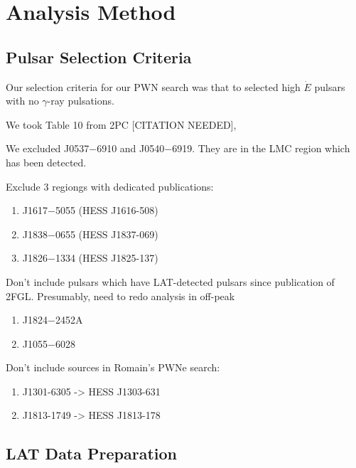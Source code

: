 \section{Analysis Method}

\subsection{Pulsar Selection Criteria}

Our selection criteria for our PWN search was that to selected high $\dot E$
pulsars with no $\gamma$-ray pulsations.

We took Table 10 from 2PC [CITATION NEEDED],

We excluded J0537$-$6910 and J0540$-$6919. They are in the LMC region which has been detected.

Exclude 3 regiongs with dedicated publications:
\begin{enumerate}
  \item J1617$-$5055 (HESS J1616-508)
  \item J1838$-$0655 (HESS J1837-069)
  \item J1826$-$1334 (HESS J1825-137)
\end{enumerate}

Don't include pulsars which have LAT-detected pulsars since publication of 2FGL.
Presumably, need to redo analysis in off-peak
\begin{enumerate}
  \item J1824$-$2452A 
  \item J1055$-$6028
\end{enumerate}

Don't include sources in Romain's PWNe search:
\begin{enumerate}
  \item J1301-6305 -> HESS J1303-631
  \item J1813-1749 -> HESS J1813-178
\end{enumerate}

\subsection{LAT Data Preparation}
